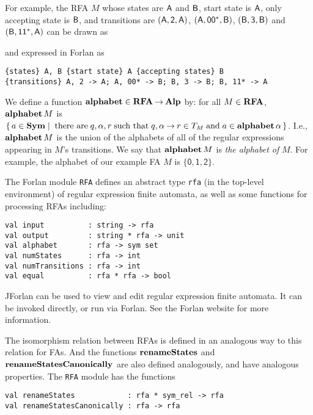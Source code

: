 For example, the RFA $M$ whose states are $\mathsf{A}$ and $\mathsf{B}$, start
state is $\mathsf{A}$, only accepting state is $\mathsf{B}$, and
transitions are $(\mathsf{A},\mathsf{2}, \mathsf{A})$, $(\mathsf{A},\mathsf{0}\mathsf{0}^*,\mathsf{B})$,
$(\mathsf{B},\mathsf{3},\mathsf{B})$ and $(\mathsf{B},\mathsf{1}\mathsf{1}^*,\mathsf{A})$ can
be drawn as
\begin{center}
  
\end{center}
and expressed in Forlan as
\begin{verbatim}
{states} A, B {start state} A {accepting states} B
{transitions} A, 2 -> A; A, 00* -> B; B, 3 -> B; B, 11* -> A
\end{verbatim}

%
We define a function $\mathbf{alphabet}\in\mathbf{RFA}\mathbin{\to}\mathbf{Alp}$ by: for all
$M\in\mathbf{RFA}$, $\mathbf{alphabet}\,M$ is $\{ \, a\in\mathbf{Sym} \mid \;\allowbreak\mbox{there
    are}\allowbreak\;q,\alpha,r\;\allowbreak\mbox{such that}\allowbreak\; q,\alpha\mathbin{\to} r\in
  T_M\;\allowbreak\mbox{and}\allowbreak\;a\in\mathbf{alphabet}\,\alpha \, \}$.  I.e., $\mathbf{alphabet}\,M$ is the
union of the alphabets of all of the regular expressions appearing in
$M$'s transitions.  We say that $\mathbf{alphabet}\,M$ is \emph{the alphabet
  of} $M$.  For example, the alphabet of our example FA $M$ is
$\{\mathsf{0,1,2}\}$.

The Forlan module \texttt{RFA} defines an abstract type \texttt{rfa}
%
%
(in the top-level environment) of regular expression finite automata,
as well as some functions for processing RFAs including:
\begin{verbatim}
val input          : string -> rfa
val output         : string * rfa -> unit 
val alphabet       : rfa -> sym set
val numStates      : rfa -> int
val numTransitions : rfa -> int
val equal          : rfa * rfa -> bool
\end{verbatim}
%
%
%
%
%
%
JForlan can be used to view and edit regular expression finite
automata.  It can be invoked directly, or run via Forlan.  See the
Forlan website for more information.

The isomorphism relation between RFAs is defined in an analogous way
to this relation for FAs.  And the functions $\mathbf{renameStates}$
and $\mathbf{renameStatesCanonically}$ are also defined analogously, and
have analogous properties. The \texttt{RFA} module has the functions
\begin{verbatim}
val renameStates            : rfa * sym_rel -> rfa
val renameStatesCanonically : rfa -> rfa
\end{verbatim}
%
%

